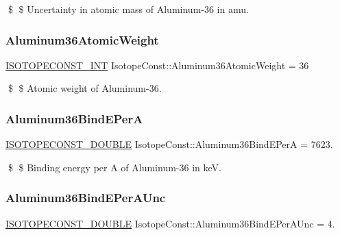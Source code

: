 \$ \$ Uncertainty in atomic mass of Aluminum-\/36 in amu. \mbox{\label{group___isotope_const-_aluminum-_al36_ga87aa554574330f5574cc5e5980abdf9f}} 
\subsubsection{\texorpdfstring{Aluminum36\+Atomic\+Weight}{Aluminum36AtomicWeight}}
{\footnotesize\ttfamily \mbox{\hyperlink{group___isotope_const-_macros_ga5f18360b3e99483a35c32d789e62621c}{I\+S\+O\+T\+O\+P\+E\+C\+O\+N\+S\+T\+\_\+\+I\+NT}} Isotope\+Const\+::\+Aluminum36\+Atomic\+Weight = 36}

\$ \$ Atomic weight of Aluminum-\/36. \mbox{\label{group___isotope_const-_aluminum-_al36_ga49776ccf3216c80b9cc5ff9ffb288fe1}} 
\subsubsection{\texorpdfstring{Aluminum36\+Bind\+E\+PerA}{Aluminum36BindEPerA}}
{\footnotesize\ttfamily \mbox{\hyperlink{group___isotope_const-_macros_ga8f45a7272ce02c0b4c65c44636ed719a}{I\+S\+O\+T\+O\+P\+E\+C\+O\+N\+S\+T\+\_\+\+D\+O\+U\+B\+LE}} Isotope\+Const\+::\+Aluminum36\+Bind\+E\+PerA = 7623.}

\$ \$ Binding energy per A of Aluminum-\/36 in keV. \mbox{\label{group___isotope_const-_aluminum-_al36_ga56435e8f9173cba6be9bac72ecbec525}} 
\subsubsection{\texorpdfstring{Aluminum36\+Bind\+E\+Per\+A\+Unc}{Aluminum36BindEPerAUnc}}
{\footnotesize\ttfamily \mbox{\hyperlink{group___isotope_const-_macros_ga8f45a7272ce02c0b4c65c44636ed719a}{I\+S\+O\+T\+O\+P\+E\+C\+O\+N\+S\+T\+\_\+\+D\+O\+U\+B\+LE}} Isotope\+Const\+::\+Aluminum36\+Bind\+E\+Per\+A\+Unc = 4.}

